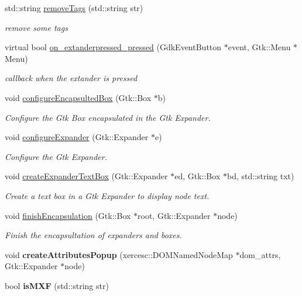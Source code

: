 \begin{DoxyCompactItemize}
\item 
std\-::string \hyperlink{classmetadataWindow_a3cb435b4c59fafc22e57fd379e52ed14}{remove\-Tags} (std\-::string str)
\begin{DoxyCompactList}\small\item\em remove some tags \end{DoxyCompactList}\item 
virtual bool \hyperlink{classmetadataWindow_ac6711198307bb1a780d3fa13a486f256}{on\-\_\-extanderpressed\-\_\-pressed} (Gdk\-Event\-Button $\ast$event, Gtk\-::\-Menu $\ast$Menu)
\begin{DoxyCompactList}\small\item\em callback when the extander is pressed \end{DoxyCompactList}\item 
void \hyperlink{classmetadataWindow_a20dedcaf9057a85a8033b29a202214cf}{configure\-Encapsulted\-Box} (Gtk\-::\-Box $\ast$b)
\begin{DoxyCompactList}\small\item\em Configure the Gtk Box encapsulated in the Gtk Expander. \end{DoxyCompactList}\item 
void \hyperlink{classmetadataWindow_adf77f62354414a9f0c6c7157953b2603}{configure\-Expander} (Gtk\-::\-Expander $\ast$e)
\begin{DoxyCompactList}\small\item\em Configure the Gtk Expander. \end{DoxyCompactList}\item 
void \hyperlink{classmetadataWindow_a857d8feb99b39353543ba06cb95c556b}{create\-Expander\-Text\-Box} (Gtk\-::\-Expander $\ast$ed, Gtk\-::\-Box $\ast$bd, std\-::string txt)
\begin{DoxyCompactList}\small\item\em Create a text box in a Gtk Expander to display node text. \end{DoxyCompactList}\item 
void \hyperlink{classmetadataWindow_a948d0b57a9da4e038765c783abccb995}{finish\-Encapsulation} (Gtk\-::\-Box $\ast$root, Gtk\-::\-Expander $\ast$node)
\begin{DoxyCompactList}\small\item\em Finish the encapsultation of expanders and boxes. \end{DoxyCompactList}\item 
\hypertarget{classmetadataWindow_aa374afa5e4b82cb23e244292228569a8}{void {\bfseries create\-Attributes\-Popup} (xercesc\-::\-D\-O\-M\-Named\-Node\-Map $\ast$dom\-\_\-attrs, Gtk\-::\-Expander $\ast$node)}\label{classmetadataWindow_aa374afa5e4b82cb23e244292228569a8}

\item 
\hypertarget{classmetadataWindow_a90eea834926af13f76f1953609e4d590}{bool {\bfseries is\-M\-X\-F} (std\-::string str)}\label{classmetadataWindow_a90eea834926af13f76f1953609e4d590}

\end{DoxyCompactItemize}
